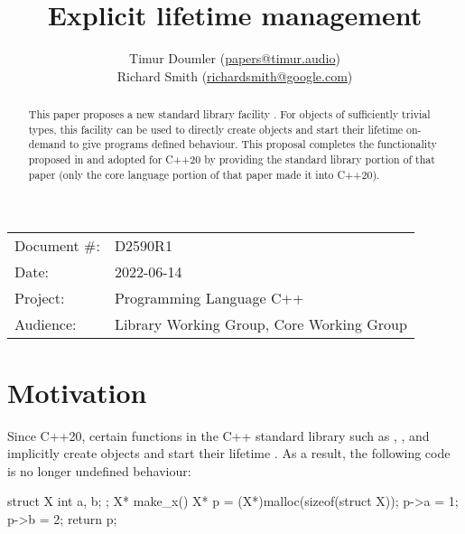 

\newcommand{\forceindent}{\parindent=1em\indent\parindent=0pt\relax} %


\title{Explicit lifetime management}
\author{
  Timur Doumler \small(\href{mailto:papers@timur.audio}{papers@timur.audio}) \\
  Richard Smith \small(\href{mailto:richardsmith@google.com}{richardsmith@google.com})
}
\date{}
\maketitle

\begin{tabular}{ll}
Document \#: & D2590R1 \\
Date: & 2022-06-14\\
Project: & Programming Language C++ \\
Audience: & Library Working Group, Core Working Group
\end{tabular}


\begin{abstract}
This paper proposes a new standard library facility . For objects of sufficiently trivial types, this facility can be used to directly create objects and start their lifetime on-demand to give programs defined behaviour. This proposal completes the functionality  proposed in \cite{P0593R6} and adopted for C++20 by providing the standard library portion of that paper (only the core language portion of that paper made it into C++20).
\end{abstract}

\section{Motivation}
\label{sec:motivation}

Since C++20, certain functions in the C++ standard library such as , , and  implicitly create objects and start their lifetime \cite{P0593R6}. As a result, the following code is no longer undefined behaviour:

\begin{codeblock}
struct X { int a, b; };
X* make_x() {
  X* p = (X*)malloc(sizeof(struct X));
  p->a = 1;
  p->b = 2;
  return p;
}
\end{codeblock}

